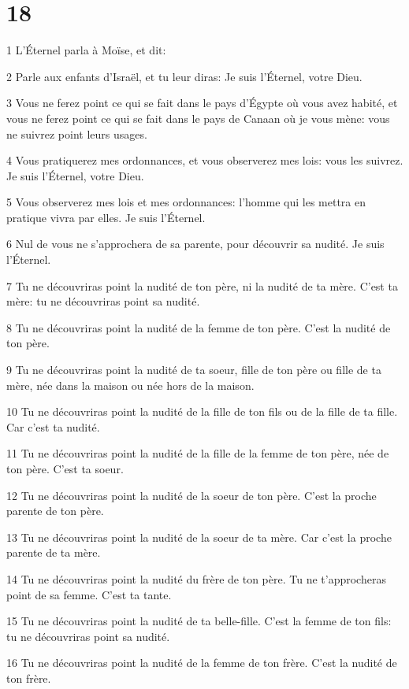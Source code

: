 \chapter{18}

\par 1 L'Éternel parla à Moïse, et dit:
\par 2 Parle aux enfants d'Israël, et tu leur diras: Je suis l'Éternel, votre Dieu.
\par 3 Vous ne ferez point ce qui se fait dans le pays d'Égypte où vous avez habité, et vous ne ferez point ce qui se fait dans le pays de Canaan où je vous mène: vous ne suivrez point leurs usages.
\par 4 Vous pratiquerez mes ordonnances, et vous observerez mes lois: vous les suivrez. Je suis l'Éternel, votre Dieu.
\par 5 Vous observerez mes lois et mes ordonnances: l'homme qui les mettra en pratique vivra par elles. Je suis l'Éternel.
\par 6 Nul de vous ne s'approchera de sa parente, pour découvrir sa nudité. Je suis l'Éternel.
\par 7 Tu ne découvriras point la nudité de ton père, ni la nudité de ta mère. C'est ta mère: tu ne découvriras point sa nudité.
\par 8 Tu ne découvriras point la nudité de la femme de ton père. C'est la nudité de ton père.
\par 9 Tu ne découvriras point la nudité de ta soeur, fille de ton père ou fille de ta mère, née dans la maison ou née hors de la maison.
\par 10 Tu ne découvriras point la nudité de la fille de ton fils ou de la fille de ta fille. Car c'est ta nudité.
\par 11 Tu ne découvriras point la nudité de la fille de la femme de ton père, née de ton père. C'est ta soeur.
\par 12 Tu ne découvriras point la nudité de la soeur de ton père. C'est la proche parente de ton père.
\par 13 Tu ne découvriras point la nudité de la soeur de ta mère. Car c'est la proche parente de ta mère.
\par 14 Tu ne découvriras point la nudité du frère de ton père. Tu ne t'approcheras point de sa femme. C'est ta tante.
\par 15 Tu ne découvriras point la nudité de ta belle-fille. C'est la femme de ton fils: tu ne découvriras point sa nudité.
\par 16 Tu ne découvriras point la nudité de la femme de ton frère. C'est la nudité de ton frère.

